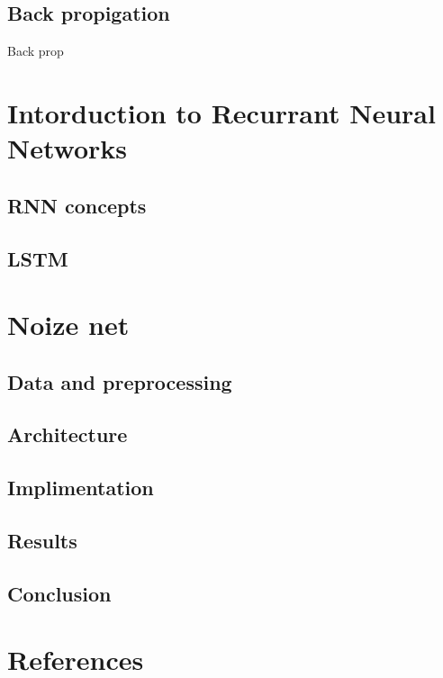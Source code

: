 \documentclass{article}
\begin{document}
\subsection{Back propigation}
\label{sec:back}
Back prop

\section{Intorduction to Recurrant Neural Networks}
\label{sec:intoRNNs}
\subsection{RNN concepts}
\label{sec:RNNS}
\subsection{LSTM}
\label{sec:LSTM}

\section{Noize net}
\label{sec:nn}
\subsection{Data and preprocessing}
\label{sec:data}
\subsection{Architecture}
\label{sec:arch}
\subsection{Implimentation}
\label{sec:impl}
\subsection{Results}
\label{sec:results}
\subsection{Conclusion}
\label{sec:conclusion}

\section{References}
\end{document}
